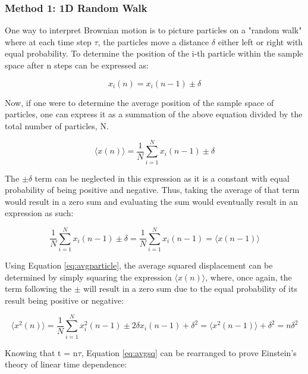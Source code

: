 \documentclass[12pt, letterpaper, twoside]{article}
\begin{document}
\subsubsection*{Method 1: 1D Random Walk}

One way to interpret Brownian motion is to picture particles on a "random walk" where at each time step $\tau$, the particles move a distance $\delta$ either left or right with equal probability. To determine the position of the i-th particle within the sample space after n steps can be expressed as:

\begin{equation*}
    x_i(n) = x_i(n-1) \pm \delta
\end{equation*}

Now, if one were to determine the average position of the sample space of particles, one can express it as a summation of the above equation divided by the total number of particles, N.

\begin{equation}
    \langle x(n) \rangle = \frac{1}{N}\sum_{i=1}^Nx_i(n-1) \pm \delta \label{eq:avgparticle}
\end{equation}

The $\pm\delta$ term can be neglected in this expression as it is a constant with equal probability of being positive and negative. Thus, taking the average of that term would result in a zero sum and evaluating the sum would eventually result in an expression as such:

\begin{equation*}
    \frac{1}{N}\sum_{i=1}^Nx_i(n-1) \pm \delta = \frac{1}{N}\sum_{i=1}^Nx_i(n-1) = \langle x(n-1) \rangle
\end{equation*}

Using Equation \ref{eq:avgparticle}, the average squared displacement can be determined by simply squaring the expression $\langle x(n) \rangle$, where, once again, the term following the $\pm$ will result in a zero sum due to the equal probability of its result being positive or negative:

\begin{equation}
    \langle x^2(n) \rangle = \frac{1}{N}\sum_{i=1}^Nx^2_i(n-1) \pm 2\delta x_i(n-1) + \delta^2 = \langle x^2(n-1) \rangle + \delta^2 = n\delta^2 \label{eq:avgsq}
\end{equation}

Knowing that t = n$\tau$, Equation \ref{eq:avgsq} can be rearranged to prove Einstein's theory of linear time dependence:
\end{document}
